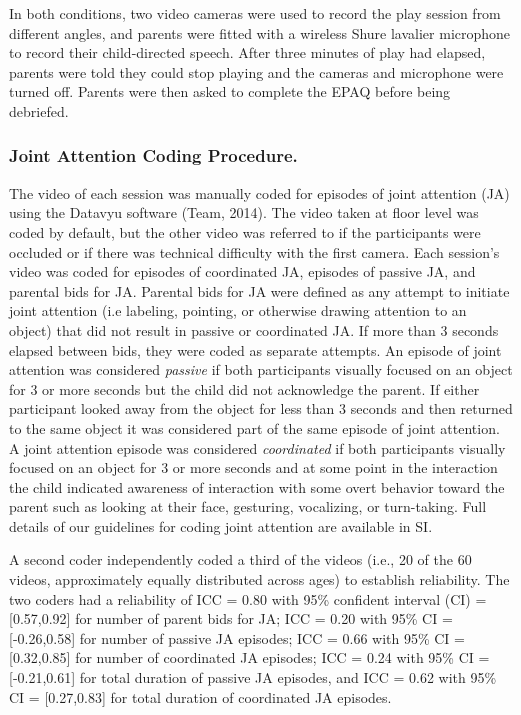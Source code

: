 \documentclass[man,floatsintext]{apa6}
\begin{document}
In both conditions, two video cameras were used to record the play session from different angles, and parents were fitted with a wireless Shure lavalier microphone to record their child-directed speech.
After three minutes of play had elapsed, parents were told they could stop playing and the cameras and microphone were turned off.
Parents were then asked to complete the EPAQ before being debriefed.

\hypertarget{joint-attention-coding-procedure.}{%
\subsubsection{Joint Attention Coding Procedure.}\label{joint-attention-coding-procedure.}}

The video of each session was manually coded for episodes of joint attention (JA) using the Datavyu software (Team, 2014).
The video taken at floor level was coded by default, but the other video was referred to if the participants were occluded or if there was technical difficulty with the first camera.
Each session's video was coded for episodes of coordinated JA, episodes of passive JA, and parental bids for JA.
Parental bids for JA were defined as any attempt to initiate joint attention (i.e labeling, pointing, or otherwise drawing attention to an object) that did not result in passive or coordinated JA.
If more than 3 seconds elapsed between bids, they were coded as separate attempts.
An episode of joint attention was considered \emph{passive} if both participants visually focused on an object for 3 or more seconds but the child did not acknowledge the parent.
If either participant looked away from the object for less than 3 seconds and then returned to the same object it was considered part of the same episode of joint attention.
A joint attention episode was considered \emph{coordinated} if both participants visually focused on an object for 3 or more seconds and at some point in the interaction the child indicated awareness of interaction with some overt behavior toward the parent such as looking at their face, gesturing, vocalizing, or turn-taking.
Full details of our guidelines for coding joint attention are available in SI.

A second coder independently coded a third of the videos (i.e., 20 of the 60 videos, approximately equally distributed across ages) to establish reliability.
The two coders had a reliability of ICC = 0.80 with 95\% confident interval (CI) = {[}0.57,0.92{]} for number of parent bids for JA; ICC = 0.20 with 95\% CI = {[}-0.26,0.58{]} for number of passive JA episodes; ICC = 0.66 with 95\% CI = {[}0.32,0.85{]} for number of coordinated JA episodes; ICC = 0.24 with 95\% CI = {[}-0.21,0.61{]} for total duration of passive JA episodes, and ICC = 0.62 with 95\% CI = {[}0.27,0.83{]} for total duration of coordinated JA episodes.
\end{document}
